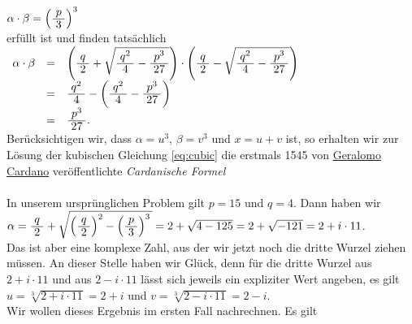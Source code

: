 $\alpha \cdot \beta = \Bigl(\bruch{p}{3}\Bigr)^3$
\\[0.2cm]
erf\"{u}llt ist und finden tats\"{a}chlich
\\[0.2cm]
\hspace*{1.3cm}
$
\begin{array}[t]{lcl}
      \alpha \cdot \beta 
& = & \left(\bruch{q}{2} + \sqrt{\bruch{q^2}{4} - \bruch{p^3}{27}}\right) \cdot
      \left(\bruch{q}{2} - \sqrt{\bruch{q^2}{4} - \bruch{p^3}{27}}\right)        \\[0.2cm]
& = & \bruch{q^2}{4} - \left(\bruch{q^2}{4} - \bruch{p^3}{27}\right)             \\[0.2cm]
& = & \bruch{p^3}{27}.                                            
\end{array}
$
\\[0.2cm]
Ber\"{u}cksichtigen wir, dass $\alpha = u^3$, $\beta = v^3$ und $x = u + v$ ist,
so erhalten wir zur L\"{o}sung der kubischen Gleichung \ref{eq:cubic} die 
erstmals 1545 von \href{http://de.wikipedia.org/wiki/Gerolamo_Cardano}{Geralomo Cardano} ver\"{o}ffentlichte 
\emph{\color{blue}Cardanische Formel}
\\[0.2cm]
\hspace*{1.3cm}
\colorbox{red}{}
\\[0.2cm]
In unserem urspr\"{u}nglichen Problem gilt $p = 15$ und $q = 4$.  Dann haben wir 
\\[0.2cm]
\hspace*{1.3cm}
$\alpha = \bruch{q}{2} + \sqrt{\left(\bruch{q}{2}\right)^2 - \left(\bruch{p}{3}\right)^3\,} =
 2 + \sqrt{4 - 125} = 2 + \sqrt{-121} = 2 + i \cdot 11
$.
\\[0.2cm]
Das ist aber eine komplexe Zahl, aus der wir jetzt noch die dritte Wurzel ziehen m\"{u}ssen.
An dieser Stelle haben wir Gl\"{u}ck, denn f\"{u}r die dritte Wurzel aus $2 + i \cdot 11$ und aus 
$2 - i \cdot 11$ l\"{a}sst sich jeweils ein expliziter Wert angeben, es gilt
\\[0.2cm]
\hspace*{1.3cm}
$u = \sqrt[3]{2 + i \cdot 11} = 2 + i$  \quad und \quad 
$v = \sqrt[3]{2 - i \cdot 11} = 2 - i$.
\\[0.2cm]
Wir wollen dieses Ergebnis im ersten Fall nachrechnen.  Es gilt
\\[0.2cm]
